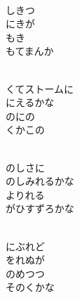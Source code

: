\documentclass[10pt,b5j]{tarticle} %
\begin{document}
\vspace{1.5em} %
\newcommand{\linespace}{0.5em} %
\newcommand{\blocksize}{0.5\hsize} %
\newcommand{\itemmargin}{6em} %
\begin{enumerate} %
    \setlength{\itemindent}{\itemmargin} %
    \begin{minipage}[c]{\blocksize}
    
        \vspace{\linespace}
        \item~\\
        しきつ\\
        にきが\\
        もき\\
        もてまんか
        
        \vspace{\linespace}
        \item~\\
        くてストームに\\
        にえるかな\\
        のにの\\
        くかこの
        
        \vspace{\linespace}
        \item~\\
        のしさに\\
        のしみれるかな\\
        よりれる\\
        がひすずろかな
        
        \vspace{\linespace}
        \item~\\
        にぶれど\\
        をれぬが\\
        のめつつ\\
        そのくかな
        

\end{minipage}
\end{enumerate}
\end{document}
